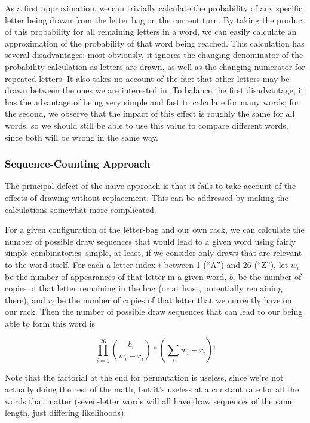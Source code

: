 \documentclass[11pt]{article}
\begin{document}
As a first approximation, we can trivially calculate the probability of any specific letter being drawn from the letter bag on the current turn.  By taking the product of this probability for all remaining letters in a word, we can easily calculate an approximation of the probability of that word being reached.  This calculation has several disadvantages: most obviously, it ignores the changing denominator of the probability calculation as letters are drawn, as well as the changing numerator for repeated letters.  It also takes no account of the fact that other letters may be drawn between the ones we are interested in.  To balance the first disadvantage, it has the advantage of being very simple and fast to calculate for many words; for the second, we observe that the impact of this effect is roughly the same for all words, so we should still be able to use this value to compare different words, since both will be wrong in the same way.

\subsubsection{Sequence-Counting Approach}
\label{sec:sequenceCounting}

The principal defect of the naive approach is that it fails to take account of the effects of drawing without replacement.  This can be addressed by making the calculations somewhat more complicated.

For a given configuration of the letter-bag and our own rack, we can calculate the number of possible draw sequences that would lead to a given word using fairly simple combinatorics--simple, at least, if we consider only draws that are relevant to the word itself.  For each a letter index $i$ between 1 (``A'') and 26 (``Z''), let $w_{i}$ be the number of appearances of that letter in a given word, $b_{i}$ be the number of copies of that letter remaining in the bag (or at least, potentially remaining there), and $r_{i}$ be the number of copies of that letter that we currently have on our rack.  Then the number of possible draw sequences that can lead to our being able to form this word is

$$\prod_{i=1}^{26}{b_{i}\choose w_{i} - r_{i}}*\left( \sum_{i}w_{i} - r_{i}\right)!$$

Note that the factorial at the end for permutation is useless, since we're not actually doing the rest of the math, but it's useless at a constant rate for all the words that matter (seven-letter words will all have draw sequences of the same length, just differing likelihoods).
\end{document}
